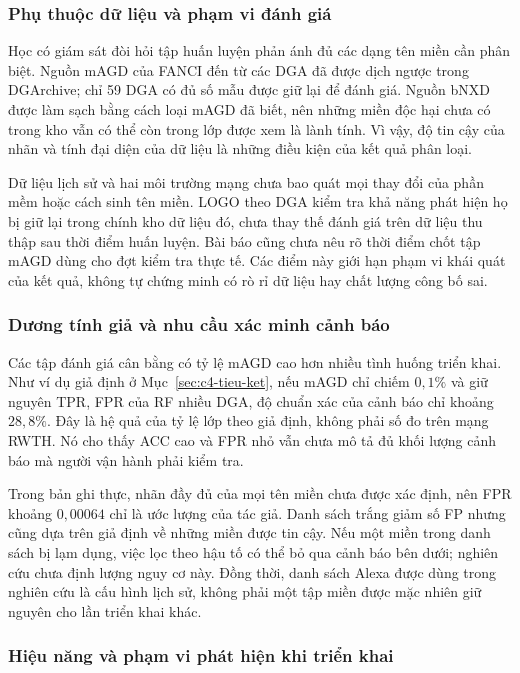 \subsubsection{Phụ thuộc dữ liệu và phạm vi đánh giá}

Học có giám sát đòi hỏi tập huấn luyện phản ánh đủ các dạng tên miền cần phân biệt. Nguồn mAGD của FANCI đến từ các DGA đã được dịch ngược trong DGArchive; chỉ 59 DGA có đủ số mẫu được giữ lại để đánh giá. Nguồn bNXD được làm sạch bằng cách loại mAGD đã biết, nên những miền độc hại chưa có trong kho vẫn có thể còn trong lớp được xem là lành tính. Vì vậy, độ tin cậy của nhãn và tính đại diện của dữ liệu là những điều kiện của kết quả phân loại.

Dữ liệu lịch sử và hai môi trường mạng chưa bao quát mọi thay đổi của phần mềm hoặc cách sinh tên miền. LOGO theo DGA kiểm tra khả năng phát hiện họ bị giữ lại trong chính kho dữ liệu đó, chưa thay thế đánh giá trên dữ liệu thu thập sau thời điểm huấn luyện. Bài báo cũng chưa nêu rõ thời điểm chốt tập mAGD dùng cho đợt kiểm tra thực tế. Các điểm này giới hạn phạm vi khái quát của kết quả, không tự chứng minh có rò rỉ dữ liệu hay chất lượng công bố sai.

\subsubsection{Dương tính giả và nhu cầu xác minh cảnh báo}

Các tập đánh giá cân bằng có tỷ lệ mAGD cao hơn nhiều tình huống triển khai. Như ví dụ giả định ở Mục~\ref{sec:c4-tieu-ket}, nếu mAGD chỉ chiếm $0{,}1\%$ và giữ nguyên TPR, FPR của RF nhiều DGA, độ chuẩn xác của cảnh báo chỉ khoảng $28{,}8\%$. Đây là hệ quả của tỷ lệ lớp theo giả định, không phải số đo trên mạng RWTH. Nó cho thấy ACC cao và FPR nhỏ vẫn chưa mô tả đủ khối lượng cảnh báo mà người vận hành phải kiểm tra.

Trong bản ghi thực, nhãn đầy đủ của mọi tên miền chưa được xác định, nên FPR khoảng $0{,}00064$ chỉ là ước lượng của tác giả. Danh sách trắng giảm số FP nhưng cũng dựa trên giả định về những miền được tin cậy. Nếu một miền trong danh sách bị lạm dụng, việc lọc theo hậu tố có thể bỏ qua cảnh báo bên dưới; nghiên cứu chưa định lượng nguy cơ này. Đồng thời, danh sách Alexa được dùng trong nghiên cứu là cấu hình lịch sử, không phải một tập miền được mặc nhiên giữ nguyên cho lần triển khai khác.

\subsubsection{Hiệu năng và phạm vi phát hiện khi triển khai}

